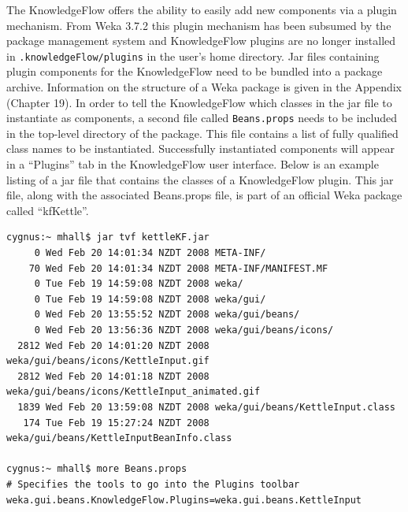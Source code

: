 The KnowledgeFlow offers the ability to easily add new components via
a plugin mechanism. From Weka 3.7.2 this plugin mechanism has been
subsumed by the package management system and KnowledgeFlow plugins
are no longer installed in \verb=.knowledgeFlow/plugins= in the user's
home directory. Jar files containing plugin components for the
KnowledgeFlow need to be bundled into a package archive. Information
on the structure of a Weka package is given in the Appendix (Chapter
19). In order to tell the KnowledgeFlow which classes in the jar file
to instantiate as components, a second file called \verb=Beans.props=
needs to be included in the top-level directory of the package. This
file contains a list of fully qualified class names to be
instantiated. Successfully instantiated components will appear in a
``Plugins'' tab in the KnowledgeFlow user interface. Below is an
example listing of a jar file that contains the classes of a
KnowledgeFlow plugin. This jar file, along with the associated
Beans.props file, is part of an official Weka package called
``kfKettle''.

\begin{verbatim}
cygnus:~ mhall$ jar tvf kettleKF.jar 
     0 Wed Feb 20 14:01:34 NZDT 2008 META-INF/
    70 Wed Feb 20 14:01:34 NZDT 2008 META-INF/MANIFEST.MF
     0 Tue Feb 19 14:59:08 NZDT 2008 weka/
     0 Tue Feb 19 14:59:08 NZDT 2008 weka/gui/
     0 Wed Feb 20 13:55:52 NZDT 2008 weka/gui/beans/
     0 Wed Feb 20 13:56:36 NZDT 2008 weka/gui/beans/icons/
  2812 Wed Feb 20 14:01:20 NZDT 2008 weka/gui/beans/icons/KettleInput.gif
  2812 Wed Feb 20 14:01:18 NZDT 2008 weka/gui/beans/icons/KettleInput_animated.gif
  1839 Wed Feb 20 13:59:08 NZDT 2008 weka/gui/beans/KettleInput.class
   174 Tue Feb 19 15:27:24 NZDT 2008 weka/gui/beans/KettleInputBeanInfo.class

cygnus:~ mhall$ more Beans.props 
# Specifies the tools to go into the Plugins toolbar
weka.gui.beans.KnowledgeFlow.Plugins=weka.gui.beans.KettleInput
\end{verbatim}
